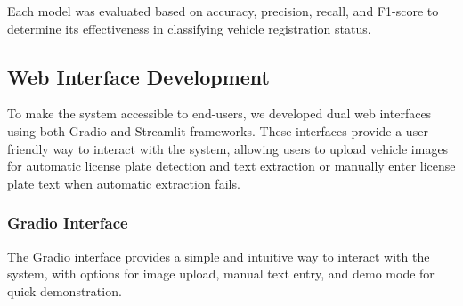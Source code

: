 \documentclass[conference]{IEEEtran}
\begin{document}
Each model was evaluated based on accuracy, precision, recall, and F1-score to determine its effectiveness in classifying vehicle registration status.

\subsection{Web Interface Development}
To make the system accessible to end-users, we developed dual web interfaces using both Gradio and Streamlit frameworks. These interfaces provide a user-friendly way to interact with the system, allowing users to upload vehicle images for automatic license plate detection and text extraction or manually enter license plate text when automatic extraction fails.

\subsubsection{Gradio Interface}
The Gradio interface provides a simple and intuitive way to interact with the system, with options for image upload, manual text entry, and demo mode for quick demonstration.
\end{document}
